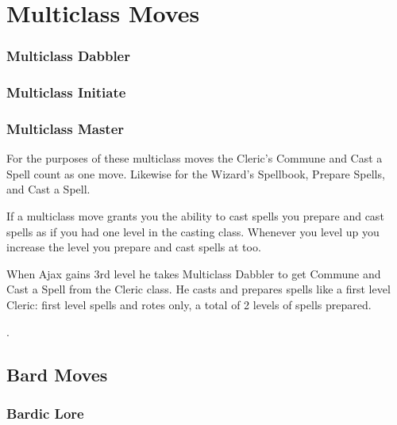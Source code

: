 \chapter{Multiclass Moves}
   
       
\subsection{Multiclass Dabbler}    
       
\subsection{Multiclass Initiate}    
       
\subsection{Multiclass Master}    
       

For the purposes of these multiclass moves the Cleric's Commune and Cast a Spell count as one move. Likewise for the Wizard's Spellbook, Prepare Spells, and Cast a Spell.

       

If a multiclass move grants you the ability to cast spells you prepare and cast spells as if you had one level in the casting class. Whenever you level up you increase the level you prepare and cast spells at too.

       
\startExample
When Ajax gains 3rd level he takes Multiclass Dabbler to get Commune and Cast a Spell from the Cleric class. He casts and prepares spells like a first level Cleric: first level spells and rotes only, a total of 2 levels of spells prepared.
\stopExample

.
       
\section{Bard Moves}  

  
       
\subsection{Bardic Lore}    
       

